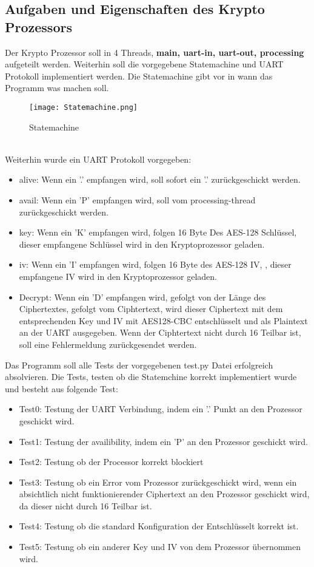 \subsection{Aufgaben und Eigenschaften des Krypto Prozessors}
    Der Krypto Prozessor soll in 4 Threads, \textbf{main, uart-in, uart-out, processing} aufgeteilt werden. Weiterhin soll die vorgegebene Statemachine und UART Protokoll implementiert werden. 
    Die Statemachine gibt vor in wann das Programm was machen soll. 
    \begin{figure}[!htb]
        \centering
        \texttt{[image: Statemachine.png]}
        \caption{Statemachine}
        \label{caption:Statemachine}
    \end{figure}
    \\
    Weiterhin wurde ein UART Protokoll vorgegeben: 
    \begin{itemize}
        \setlength\itemsep{0em}
        \item alive: Wenn ein '.' empfangen wird, soll sofort ein '.' zurückgeschickt werden. 
        \item avail: Wenn ein 'P' empfangen wird, soll vom processing-thread  zurückgeschickt werden. 
        \item key: Wenn ein 'K' empfangen wird, folgen 16 Byte Des AES-128 Schlüssel, dieser empfangene Schlüssel wird in den Kryptoprozessor geladen.  
        \item iv: Wenn ein 'I' empfangen wird, folgen 16 Byte des AES-128 IV, , dieser empfangene IV wird in den Kryptoprozessor geladen.
        \item Decrypt: Wenn ein 'D' empfangen wird, gefolgt von der Länge des Ciphertextes, gefolgt vom Ciphtertext, wird dieser Ciphertext mit dem 
        entsprechenden Key und IV mit AES128-CBC entschlüsselt und als Plaintext an der UART ausgegeben. 
        Wenn der Ciphtertext nicht durch 16 Teilbar ist, soll eine Fehlermeldung  zurückgesendet werden. 
    \end{itemize}
    \noindent Das Programm soll alle Tests der vorgegebenen test.py Datei erfolgreich absolvieren. 
    Die Tests, testen ob die Statemchine korrekt implementiert wurde und besteht aus folgende Test: 
    \begin{itemize}
        \setlength\itemsep{0em}
        \item Test0: Testung der UART Verbindung, indem ein '.' Punkt an den Prozessor geschickt wird. 
        \item Test1: Testung der availibility, indem ein 'P' an den Prozessor geschickt wird. 
        \item Test2: Testung ob der Processor korrekt blockiert 
        \item Test3: Testung ob ein Error vom Prozessor zurückgeschickt wird, wenn ein absichtlich nicht funktionierender Ciphertext an den Prozessor geschickt wird, da dieser nicht durch 16 Teilbar ist. 
        \item Test4: Testung ob die standard Konfiguration der Entschlüsselt korrekt ist. 
        \item Test5: Testung ob ein anderer Key und IV von dem Prozessor übernommen wird. 
    \end{itemize}
    
